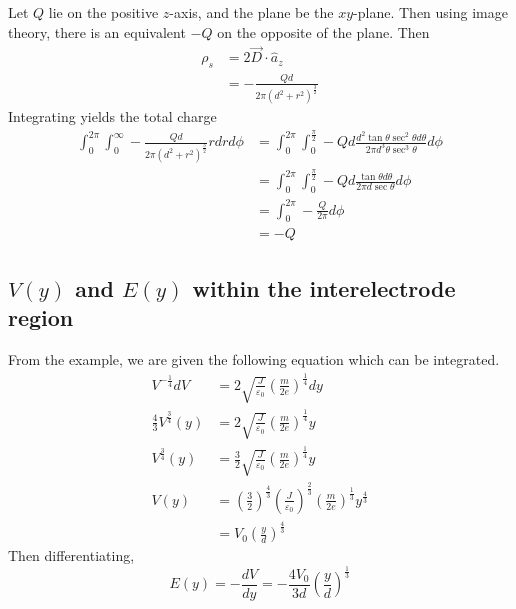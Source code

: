 \documentclass[answers]{exam}
\begin{document}
\begin{questions}
\begin{solution}
    Let $Q$ lie on the positive $z$-axis, and the plane be the $xy$-plane. Then using image theory, there is an equivalent $-Q$ on the opposite of the plane. Then
    \begin{align*}
        \rho_s &= 2\vec{D} \cdot \hat{a}_z \\
               &= -\frac{Qd}{2\pi(d^2+r^2)^{\frac{3}{2}}}
    \end{align*}
    Integrating yields the total charge
    \begin{align*}
        \int_0^{2\pi} \int_0^\infty -\frac{Qd}{2\pi(d^2+r^2)^{\frac{3}{2}}} rdrd\phi &= \int_0^{2\pi} \int_0^{\frac{\pi}{2}} -Qd\frac{d^2\tan\theta\sec^2\theta d\theta}{2\pi d^3\theta\sec^3\theta} d\phi \\
                                                                                     &= \int_0^{2\pi} \int_0^{\frac{\pi}{2}} -Qd \frac{\tan\theta d\theta}{2\pi d\sec\theta} d\phi \\
                                                                                     &= \int_0^{2\pi} -\frac{Q}{2\pi} d\phi \\
                                                                                     &= -Q
    \end{align*}
\end{solution}


\begin{parts}
    \part{$V(y)$ and $E(y)$ within the interelectrode region}

    \begin{solution}
        From the example, we are given the following equation which can be integrated.
        \begin{align*}
            V^{-\frac{1}{4}}dV &= 2\sqrt{\frac{J}{\varepsilon_0}}\left(\frac{m}{2e}\right)^{\frac{1}{4}}dy \\
            \frac{4}{3}V^{\frac{3}{4}}(y) &= 2\sqrt{\frac{J}{\varepsilon_0}}\left(\frac{m}{2e}\right)^{\frac{1}{4}}y \\
            V^{\frac{3}{4}}(y) &= \frac{3}{2}\sqrt{\frac{J}{\varepsilon_0}}\left(\frac{m}{2e}\right)^{\frac{1}{4}}y \\
            V(y) &= \left(\frac{3}{2}\right)^{\frac{4}{3}}\left(\frac{J}{\varepsilon_0}\right)^{\frac{2}{3}}\left(\frac{m}{2e}\right)^{\frac{1}{3}}y^{\frac{4}{3}} \\
                 &= V_0\left(\frac{y}{d}\right)^{\frac{4}{3}}
        \end{align*}
        Then differentiating,
        $$E(y) = -\frac{dV}{dy} = -\frac{4V_0}{3d}\left(\frac{y}{d}\right)^{\frac{1}{3}}$$
    \end{solution}


\end{parts}
\end{questions}
\end{document}
